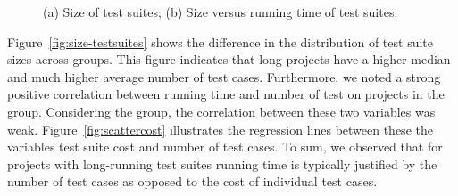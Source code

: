 \begin{figure}[t!]%
  \centering
  \qquad
  \caption{\label{fig:time-versus-size}(a) Size of test suites; (b)
    Size versus running time of test suites.}%
  \vspace{-5mm}
\end{figure}

Figure~\ref{fig:size-testsuites} shows the difference in the
distribution of test suite sizes across groups.  This figure indicates
that long projects have a higher median and much higher average number of test cases.
Furthermore, we noted a strong positive correlation between running
time and number of test on projects in the \longg{} group.
Considering the \medg{} group, the correlation between these two
variables was weak.
Figure~\ref{fig:scattercost} illustrates the regression lines between
these the variables test suite cost and number of test cases.
To sum, we observed that for projects with long-running test suites
running time is typically
justified by the number of test cases as opposed to the cost of individual test cases.

\begin{center}
\end{center}

